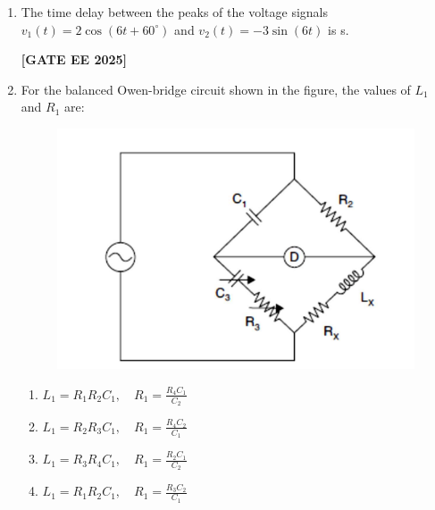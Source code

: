 \documentclass[journal]{IEEEtran}
\newcommand{\qfooter}{%
  \begin{flushright}\footnotesize\textbf{[GATE EE 2025]}\end{flushright}\vspace{1em}%
}
\begin{document}
\begin{enumerate}
\begin{enumerate}
\end{enumerate}
\qfooter

\item The time delay between the peaks of the voltage signals \(v_1(t) = 2\cos(6t + 60^\circ)\) and \(v_2(t) = -3 \sin(6t)\) is\underline{\hspace{2cm}} s.

\begin{enumerate}
\end{enumerate}
\qfooter

\item For the balanced Owen-bridge circuit shown in the figure, the values of \(L_1\) and \(R_1\) are:

\begin{figure}[H]
\centering
\includegraphics[width=0.4\columnwidth]{figs/q19.png}
\end{figure}

\begin{enumerate}
\item \(L_1 = R_1 R_2 C_1,\quad R_1 = \frac{R_4 C_1}{C_2}\)
\item \(L_1 = R_2 R_3 C_1,\quad R_1 = \frac{R_4 C_2}{C_1}\)
\item \(L_1 = R_3 R_4 C_1,\quad R_1 = \frac{R_2 C_1}{C_2}\)
\item \(L_1 = R_1 R_2 C_1,\quad R_1 = \frac{R_3 C_2}{C_1}\)


\end{enumerate}
\end{enumerate}
\end{document}
